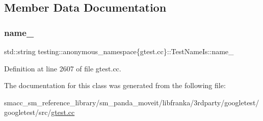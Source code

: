 \subsection{Member Data Documentation}
\mbox{\label{classtesting_1_1anonymous__namespace_02gtest_8cc_03_1_1TestNameIs_a7e6936885d47805330525cc94e4a2f00}} 
\subsubsection{\texorpdfstring{name\+\_\+}{name\_}}
{\footnotesize\ttfamily std\+::string testing\+::anonymous\+\_\+namespace\{gtest.\+cc\}\+::Test\+Name\+Is\+::name\+\_\+\hspace{0.3cm}{\ttfamily [private]}}



Definition at line 2607 of file gtest.\+cc.



The documentation for this class was generated from the following file\+:\begin{DoxyCompactItemize}
\item 
smacc\+\_\+sm\+\_\+reference\+\_\+library/sm\+\_\+panda\+\_\+moveit/libfranka/3rdparty/googletest/googletest/src/\hyperlink{gtest_8cc}{gtest.\+cc}\end{DoxyCompactItemize}
